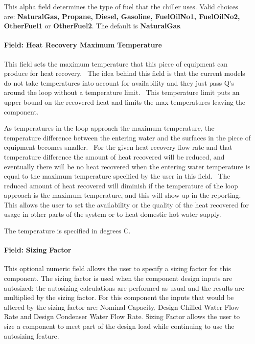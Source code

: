 This alpha field determines the type of fuel that the chiller uses. Valid choices are: \textbf{NaturalGas, Propane, Diesel, Gasoline, FuelOilNo1, FuelOilNo2, OtherFuel1} or \textbf{OtherFuel2}. The default is \textbf{NaturalGas}.

\paragraph{Field: Heat Recovery Maximum Temperature}\label{field-heat-recovery-maximum-temperature-000}

This field sets the maximum temperature that this piece of equipment can produce for heat recovery.~ The idea behind this field is that the current models do not take temperatures into account for availability and they just pass Q's around the loop without a temperature limit.~ This temperature limit puts an upper bound on the recovered heat and limits the max temperatures leaving the component.

As temperatures in the loop approach the maximum temperature, the temperature difference between the entering water and the surfaces in the piece of equipment becomes smaller.~ For the given heat recovery flow rate and that temperature difference the amount of heat recovered will be reduced, and eventually there will be no heat recovered when the entering water temperature is equal to the maximum temperature specified by the user in this field.~ The reduced amount of heat recovered will diminish if the temperature of the loop approach is the maximum temperature, and this will show up in the reporting.~ This allows the user to set the availability or the quality of the heat recovered for usage in other parts of the system or to heat domestic hot water supply.

The temperature is specified in degrees C.

\paragraph{Field: Sizing Factor}\label{field-sizing-factor-7}

This optional numeric field allows the user to specify a sizing factor for this component. The sizing factor is used when the component design inputs are autosized: the autosizing calculations are performed as usual and the results are multiplied by the sizing factor. For this component the inputs that would be altered by the sizing factor are: Nominal Capacity, Design Chilled Water Flow Rate and Design Condenser Water Flow Rate. Sizing Factor allows the user to size a component to meet part of the design load while continuing to use the autosizing feature.

